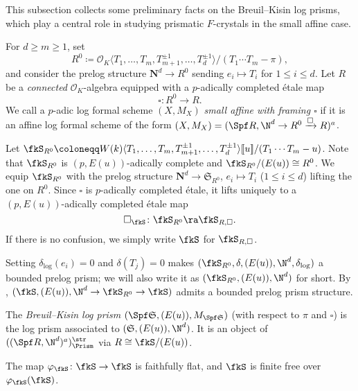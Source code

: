 This subsection collects some preliminary facts on the Breuil--Kisin log prisms, which play a central role in studying prismatic $F$-crystals in the small affine case. 

For $d\geq m\geq 1$, set
\[
R^0\coloneqq \mathcal{O}_K \langle T_1, \ldots, T_m, T_{m+1}^{\pm 1}, \ldots, T_d^{\pm 1}\rangle / (T_1\cdots T_m - \pi),
\]
and consider the prelog structure $\mathbf{N}^d \rightarrow R^0$ sending $e_i \mapsto T_i$ for $1 \leq i \leq d$.
Let $R$ be a \emph{connected} $\mathcal{O}_K$-algebra equipped with a $p$-adically completed \'etale map 
\[
\square\colon R^0 \rightarrow R.
\]
We call a $p$-adic log formal scheme $(X,M_X)$ \emph{small affine with framing $\square$} if it is an affine log formal scheme of the form $(X,M_X)=(\Spf R, \N^d\rightarrow R^0\xrightarrow{\square} R)^a$.

Let $\fkS_{R^0}\coloneqq W(k)\langle T_1, \ldots, T_m, T_{m+1}^{\pm 1}, \ldots, T_d^{\pm 1}\rangle[\![u]\!] / (T_1\cdots T_m-u)$. Note that $\fkS_{R^0}$ is $(p,E(u))$-adically complete and $\fkS_{R^0}/(E(u)) \cong R^0$. We equip $\fkS_{R^0}$ with the prelog structure $\mathbf{N}^d \rightarrow \mathfrak{S}_{R^0}$, $e_i \mapsto T_i$ ($1 \leq i \leq d$) lifting the one on $R^0$. Since $\square$ is $p$-adically completed \'etale, it lifts uniquely to a $(p,E(u))$-adically completed \'etale map 
\[
\square_{\fkS}\colon \fkS_{R^0}\ra \fkS_{R,\square}.
\]
If there is no confusion, we simply write $\fkS$ for $\fkS_{R,\square}$.

Setting $\delta_{\mathrm{log}}(e_i) = 0 $ and $\delta(T_j) = 0$ makes $(\fkS_{R^0}, \delta, (E(u)), \N^d, \delta_{\mathrm{log}})$ a bounded prelog prism; we will also write it as $(\fkS_{R^0}, (E(u)), \N^d)$ for short. By \cite[Lem.~2.13]{koshikawa}, $(\fkS, (E(u)), \N^d\rightarrow \fkS_{R^0}\rightarrow \fkS)$ admits a bounded prelog prism structure.

\begin{defn}
The \emph{Breuil--Kisin log prism} $(\Spf \mathfrak{S}, (E(u)), M_{\Spf \mathfrak{S}})$ (with respect to $\pi$ and $\square$) is the log prism associated to $(\mathfrak{S}, (E(u)), \N^d)$. It is an object of $((\Spf R,\N^d)^a)_\Prism^\str$ via $R \cong \fkS/(E(u))$.
\end{defn}


\begin{lem}\label{lem:varphionfkSisfaithfullyflat}
The map $\varphi_{\fkS}\colon\fkS \to \fkS$ is faithfully flat, and $\fkS$ is finite free over $\varphi_{\fkS}(\fkS)$.
\end{lem}


